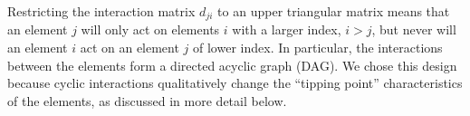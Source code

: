 \documentclass[conference]{IEEEtran}
\newcommand{\vectorsym}[1]{\ensuremath{\mathbf{#1}}}
\newcommand{\couplingconstant}{\ensuremath{d}}
\begin{document}
Restricting the interaction matrix $\couplingconstant_{ji}$ to an upper triangular
matrix means that an element $j$ will only act on elements $i$ with a
larger index, $i>j$, but
never will an element $i$ act on an element $j$ of lower index. In
particular,  the interactions between the elements form a
directed acyclic graph (DAG). %
We chose this design because cyclic interactions qualitatively change
the ``tipping point'' characteristics of the elements, as discussed in
more detail below.



\end{document}
